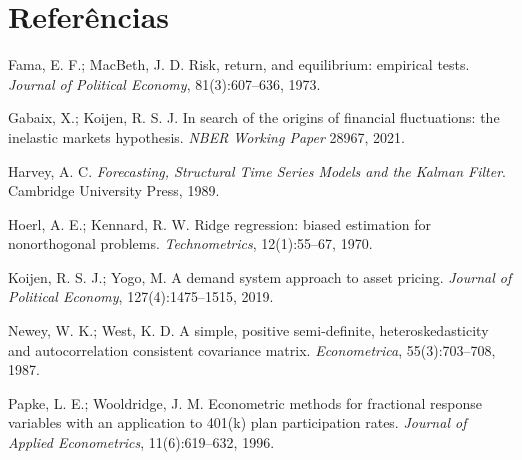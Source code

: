 \documentclass[11pt,a4paper]{article}
\begin{document}
\section*{Referências}
\small
\begin{description}
\item Fama, E. F.; MacBeth, J. D. Risk, return, and equilibrium: empirical tests.
\emph{Journal of Political Economy}, 81(3):607--636, 1973.
\item Gabaix, X.; Koijen, R. S. J. In search of the origins of financial fluctuations: the
inelastic markets hypothesis. \emph{NBER Working Paper} 28967, 2021.
\item Harvey, A. C. \emph{Forecasting, Structural Time Series Models and the Kalman Filter}.
Cambridge University Press, 1989.
\item Hoerl, A. E.; Kennard, R. W. Ridge regression: biased estimation for nonorthogonal
problems. \emph{Technometrics}, 12(1):55--67, 1970.
\item Koijen, R. S. J.; Yogo, M. A demand system approach to asset pricing.
\emph{Journal of Political Economy}, 127(4):1475--1515, 2019.
\item Newey, W. K.; West, K. D. A simple, positive semi-definite, heteroskedasticity and
autocorrelation consistent covariance matrix. \emph{Econometrica}, 55(3):703--708, 1987.
\item Papke, L. E.; Wooldridge, J. M. Econometric methods for fractional response variables with
an application to 401(k) plan participation rates. \emph{Journal of Applied Econometrics},
11(6):619--632, 1996.
\end{description}
\end{document}
